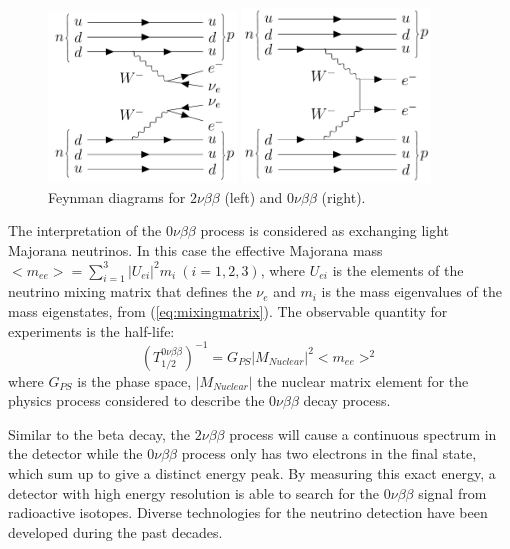 \documentclass[preprint,12pt]{elsarticle}
\numberwithin{equation}{section}
\begin{document}
\begin{figure}[htbp]
	\centering	
	\begin{minipage}[t]{0.45\textwidth}
	\includegraphics[width=5cm]{doubleBeta2nu_feynman.png}
	\end{minipage}
	\begin{minipage}[t]{0.45\textwidth}
	\includegraphics[width=5cm]{doubleBeta_feynman.png}
	\end{minipage}
	\caption{ Feynman diagrams for $2\nu\beta\beta$ (left) and $0\nu\beta\beta$ (right).}
	\label{feynman1}
\end{figure}

The interpretation of the $0\nu\beta\beta$ process is considered as exchanging light Majorana neutrinos. In this case the effective Majorana mass $<m_{ee}>=\sum_{i=1}^{3} |U_{ei}|^2m_i~(i=1,2,3)$, where $U_{ei}$ is the elements of the neutrino mixing matrix that defines the $\nu_e$ and $m_i$ is the mass eigenvalues of the mass eigenstates, from (\ref{eq:mixingmatrix}). The observable quantity for experiments is the half-life:
\[
(T^{0\nu\beta\beta}_{1/2})^{-1} = G_{PS}|M_{Nuclear}|^2<m_{ee}>^2 
\]
where $G_{PS}$ is the phase space, $|M_{Nuclear}|$ the nuclear matrix element for the physics process considered to describe the $0\nu\beta\beta$ decay process\cite{kaizuber}.

Similar to the beta decay, the $2\nu\beta\beta$ process will cause a continuous spectrum in the detector while the $0\nu\beta\beta$ process only has two electrons in the final state, which sum up to give a distinct energy peak. By measuring this exact energy, a detector with high energy resolution is able to search for the $0\nu\beta\beta$ signal from radioactive isotopes. Diverse technologies for the neutrino detection have been developed during the past decades.
\end{document}

